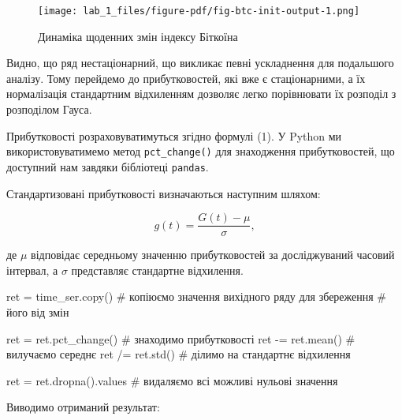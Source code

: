 \documentclass[
  letterpaper,
]{report}
\newenvironment{Shaded}{\begin{snugshade}}{\end{snugshade}}
\newcommand{\CommentTok}[1]{\textcolor[rgb]{0.37,0.37,0.37}{#1}}
\newcommand{\NormalTok}[1]{\textcolor[rgb]{0.00,0.23,0.31}{#1}}
\newcommand{\OperatorTok}[1]{\textcolor[rgb]{0.37,0.37,0.37}{#1}}
\begin{document}
\begin{figure}[H]

{\centering \texttt{[image: lab\_1\_files/figure-pdf/fig-btc-init-output-1.png]}

}

\caption{\label{fig-btc-init}Динаміка щоденних змін індексу Біткоїна}

\end{figure}

Видно, що ряд нестаціонарний, що викликає певні ускладнення для
подальшого аналізу. Тому перейдемо до прибутковостей, які вже є
стаціонарними, а їх нормалізація стандартним відхиленням дозволяє легко
порівнювати їх розподіл з розподілом Гауса.

Прибутковості розраховуватимуться згідно формулі (1). У Python ми
використовуватимемо метод \texttt{pct\_change()} для знаходження
прибутковостей, що доступний нам завдяки бібліотеці \texttt{pandas}.

Стандартизовані прибутковості визначаються наступним шляхом:

\[
g(t) = \frac{G(t) - \mu}{\sigma},  
\]

де \(\mu\) відповідає середньому значенню прибутковостей за
досліджуваний часовий інтервал, а \(\sigma\) представляє стандартне
відхилення.

\begin{Shaded}
\begin{Highlighting}[]
\NormalTok{ret }\OperatorTok{=}\NormalTok{ time\_ser.copy()      }\CommentTok{\# копіюємо значення вихідного ряду для збереження }
                           \CommentTok{\# його від змін}

\NormalTok{ret }\OperatorTok{=}\NormalTok{ ret.pct\_change()     }\CommentTok{\# знаходимо прибутковості}
\NormalTok{ret }\OperatorTok{{-}=}\NormalTok{ ret.mean()          }\CommentTok{\# вилучаємо середнє }
\NormalTok{ret }\OperatorTok{/=}\NormalTok{ ret.std()           }\CommentTok{\# ділимо на стандартнє відхилення}

\NormalTok{ret }\OperatorTok{=}\NormalTok{ ret.dropna().values  }\CommentTok{\# видаляємо всі можливі нульові значення }
\end{Highlighting}
\end{Shaded}

Виводимо отриманий результат:
\end{document}
